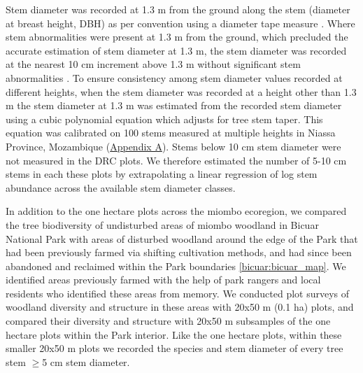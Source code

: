 \begin{refsection}
Stem diameter was recorded at 1.3 m from the ground along the stem (diameter at breast height, DBH) as per convention using a diameter tape measure \citep{Kershaw2017}. Where stem abnormalities were present at 1.3 m from the ground, which precluded the accurate estimation of stem diameter at 1.3 m, the stem diameter was recorded at the nearest 10 cm increment above 1.3 m without significant stem abnormalities \citep{Kershaw2017}. To ensure consistency among stem diameter values recorded at different heights, when the stem diameter was recorded at a height other than 1.3 m the stem diameter at 1.3 m was estimated from the recorded stem diameter using a cubic polynomial equation which adjusts for tree stem taper. This equation was calibrated on 100 stems measured at multiple heights in Niassa Province, Mozambique (\hyperref[appendixa]{Appendix A}). Stems below 10 cm stem diameter were not measured in the DRC plots. We therefore estimated the number of 5-10 cm stems in each these plots by extrapolating a linear regression of log stem abundance across the available stem diameter classes.

In addition to the one hectare plots across the miombo ecoregion, we compared the tree biodiversity of undisturbed areas of miombo woodland in Bicuar National Park with areas of disturbed woodland around the edge of the Park that had been previously farmed via shifting cultivation methods, and had since been abandoned and reclaimed within the Park boundaries \autoref{bicuar:bicuar_map}. We identified areas previously farmed with the help of park rangers and local residents who identified these areas from memory. We conducted \ndegradplots{} plot surveys of woodland diversity and structure in these areas with 20x50 m (0.1 ha) plots, and compared their diversity and structure with 20x50 m subsamples of the \nplotsbicuar{} one hectare plots within the Park interior. Like the one hectare plots, within these smaller 20x50 m plots we recorded the species and stem diameter of every tree stem $\ge$5 cm stem diameter.


\end{refsection}
